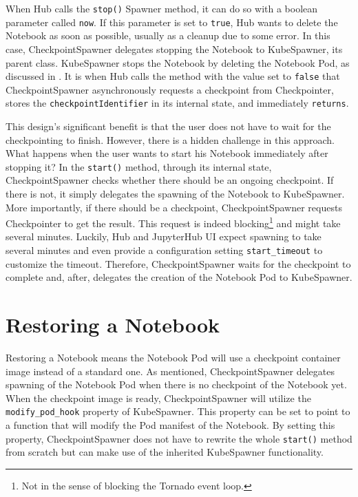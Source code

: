 \documentclass[
  digital,     %
  oneside,     %
  nosansbold,  %
  nocolorbold, %
  lof,         %
  nolot,         %
]{fithesis4}
\begin{document}
When Hub calls the \texttt{stop()} Spawner method, it can do so with a boolean parameter called \texttt{now}. If this parameter is set to \texttt{true}, Hub wants to delete the Notebook as soon as possible, usually as a cleanup due to some error. In this case, CheckpointSpawner delegates stopping the Notebook to KubeSpawner, its parent class.
KubeSpawner stops the Notebook by deleting the Notebook Pod, as discussed in .
It is when Hub calls the method with the value set to \texttt{false} that CheckpointSpawner asynchronously requests a checkpoint from Checkpointer, stores the \texttt{checkpointIdentifier} in its internal state, and immediately \texttt{returns}.

This design's significant benefit is that the user does not have to wait for the checkpointing to finish. However, there is a hidden challenge in this approach. What happens when the user wants to start his Notebook immediately after stopping it? In the \texttt{start()} method, through its internal state, CheckpointSpawner checks whether there should be an ongoing checkpoint. If there is not, it simply delegates the spawning of the Notebook to KubeSpawner. More importantly, if there should be a checkpoint, CheckpointSpawner requests Checkpointer to get the result. This request is indeed blocking\footnote{Not in the sense of blocking the Tornado event loop.} and might take several minutes. Luckily, Hub and JupyterHub UI expect spawning to take several minutes and even provide a configuration setting \texttt{start\_timeout} to customize the timeout. Therefore, CheckpointSpawner waits for the checkpoint to complete and, after, delegates the creation of the Notebook Pod to KubeSpawner.

\section{Restoring a Notebook}
Restoring a Notebook means the Notebook Pod will use a checkpoint container image instead of a standard one. As mentioned, CheckpointSpawner delegates spawning of the Notebook Pod when there is no checkpoint of the Notebook yet. When the checkpoint image is ready, CheckpointSpawner will utilize the \texttt{modify\_pod\_hook} property of KubeSpawner. This property can be set to point to a function that will modify the Pod manifest of the Notebook. By setting this property, CheckpointSpawner does not have to rewrite the whole \texttt{start()} method from scratch but can make use of the inherited KubeSpawner functionality.
\end{document}

